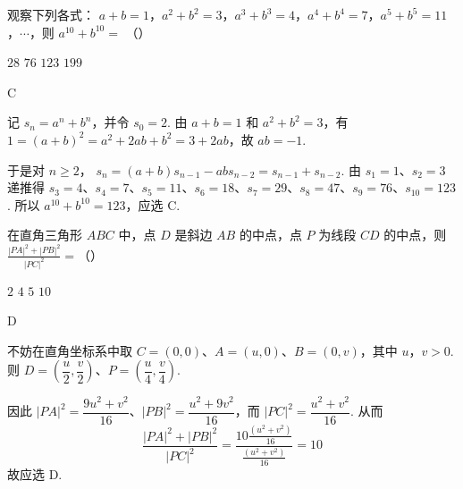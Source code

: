 \begin{problem}
观察下列各式： \(a + b = 1\)，\(a^2 + b^2 = 3\)，\(a^3 + b^3 = 4\)，\(a^4 + b^4 = 7\)，\(a^5 + b^5 = 11\)，\(\cdots\)，则 \(a^{10} + b^{10} =\) （\quad）

\choices
    {\(28\)}
    {\(76\)}
    {\(123\)}
    {\(199\)}
\end{problem}

\begin{answer}
C
\end{answer}

\begin{solution}
记 \(s_n=a^n+b^n\)，并令 \(s_0=2\). 由 \(a+b=1\) 和 \(a^2+b^2=3\)，有
\(1=(a+b)^2=a^2+2ab+b^2=3+2ab\)，故 \(ab=-1\).

于是对 \(n\geqslant2\)，
\(s_n=(a+b)s_{n-1}-ab s_{n-2}=s_{n-1}+s_{n-2}\).
由 \(s_1=1\)、\(s_2=3\) 递推得
\(s_3=4\)、\(s_4=7\)、\(s_5=11\)、\(s_6=18\)、\(s_7=29\)、\(s_8=47\)、\(s_9=76\)、\(s_{10}=123\).
所以 \(a^{10}+b^{10}=123\)，应选 C.
\end{solution}

\begin{problem}
在直角三角形 \(ABC\) 中，点 \(D\) 是斜边 \(AB\) 的中点，点 \(P\) 为线段 \(CD\) 的中点，则 \(\frac{|PA|^2 + |PB|^2}{|PC|^2} =\)（\quad）

\choices
    {\(2\)}
    {\(4\)}
    {\(5\)}
    {\(10\)}
\end{problem}

\begin{answer}
D
\end{answer}

\begin{solution}
不妨在直角坐标系中取 \(C=(0,0)\)、\(A=(u,0)\)、\(B=(0,v)\)，其中 \(u\)，\(v>0\). 则
\(D=\left(\dfrac u2,\dfrac v2\right)\)、\(P=\left(\dfrac u4,\dfrac v4\right)\).

因此
\(\lvert PA\rvert^2=\dfrac{9u^2+v^2}{16}\)、\(\lvert PB\rvert^2=\dfrac{u^2+9v^2}{16}\)，而
\(\lvert PC\rvert^2=\dfrac{u^2+v^2}{16}\). 从而
\[
\frac{\lvert PA\rvert^2+\lvert PB\rvert^2}{\lvert PC\rvert^2}
=\frac{10\frac{(u^2+v^2)}{16}}{\frac{(u^2+v^2)}{16}}=10
\]
故应选 D.
\end{solution}

